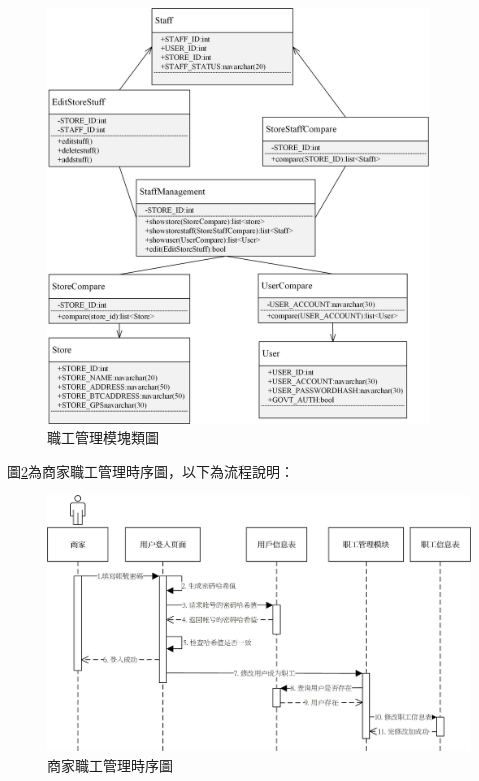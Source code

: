 	\begin{figure}[!htbp]
		\centering
		\includegraphics[width = 0.9\textwidth]{c1.jpg}
		\caption{職工管理模塊類圖}\label{c1}
	\end{figure}

	

	圖\ref{time2}為商家職工管理時序圖，以下為流程說明：

	\begin{figure}[!htbp]
		\centering
		\includegraphics[width = 1\textwidth]{time2.jpg}
		\caption{商家職工管理時序圖}\label{time2}
	\end{figure}

